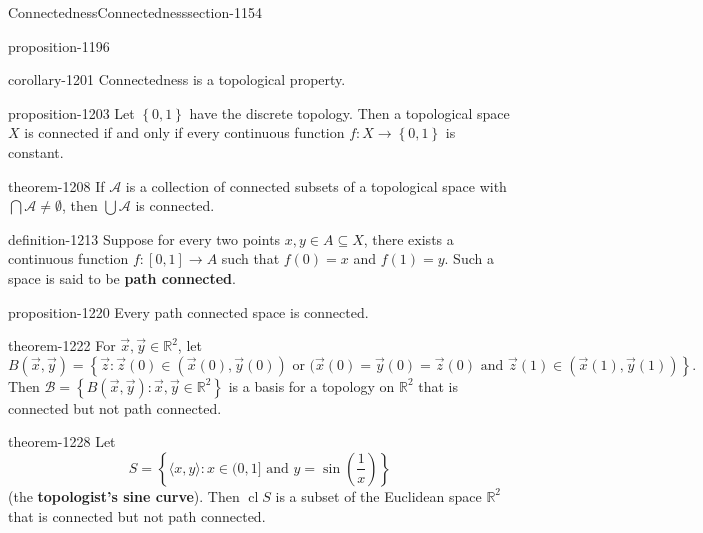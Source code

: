 \documentclass[oneside,10pt,]{article}
\newcommand{\terminology}[1]{\textbf{#1}}
\newcommand{\tuple}[1]{\langle #1 \rangle}
\newcommand{\mb}{\mathbb}
\newcommand{\mc}{\mathcal}
\newcommand{\cl}{\operatorname{cl}}
\newcommand{\setBuilder}[2]{\left\{#1:#2\right\}}
\newcommand{\setList}[1]{\left\{#1\right\}}
\begin{document}
\begin{sectionptx}{Connectedness}{}{Connectedness}{}{}{section-1154}
\begin{proposition}{}{}{proposition-1196}
\end{proposition}
\begin{corollary}{}{}{corollary-1201}%
\hypertarget{p-1202}{}%
Connectedness is a topological property.%
\end{corollary}
\begin{proposition}{}{}{proposition-1203}%
\hypertarget{p-1204}{}%
Let \(\setList{0,1}\) have the discrete topology. Then a topological space \(X\) is connected if and only if every continuous function \(f:X\to\setList{0,1}\) is constant.%
\end{proposition}
\begin{theorem}{}{}{theorem-1208}%
\hypertarget{p-1209}{}%
If \(\mc A\) is a collection of connected subsets of a topological space with \(\bigcap\mc A\not=\emptyset\), then \(\bigcup\mc A\) is connected.%
\end{theorem}
\begin{definition}{}{definition-1213}%
\hypertarget{p-1214}{}%
Suppose for every two points \(x,y\in A\subseteq X\), there exists a continuous function \(f:[0,1]\to A\) such that \(f(0)=x\) and \(f(1)=y\). Such a space is said to be \terminology{path connected}.%
\end{definition}
\begin{proposition}{}{}{proposition-1220}%
\hypertarget{p-1221}{}%
Every path connected space is connected.%
\end{proposition}
\begin{theorem}{}{}{theorem-1222}%
\hypertarget{p-1223}{}%
For \(\vec x,\vec y\in\mb R^2\), let%
\begin{equation*}
B(\vec x,\vec y)=\setBuilder{\vec z}{\vec z(0)\in(\vec x(0),\vec y(0))
\text{ or } (\vec x(0)=\vec y(0)=\vec z(0) \text{ and }
\vec z(1)\in(\vec x(1),\vec y(1))}\text{.}
\end{equation*}
Then \(\mc B=\setBuilder{B(\vec x,\vec y)}{\vec x,\vec y\in\mb R^2}\) is a basis for a topology on \(\mb R^2\) that is connected but not path connected.%
\end{theorem}
\begin{theorem}{}{}{theorem-1228}%
\hypertarget{p-1229}{}%
Let%
\begin{equation*}
S=
\setBuilder{\tuple{x,y}}{x\in(0,1]\text{ and }
y=\sin\left(\frac{1}{x}\right)}
\end{equation*}
(the \terminology{topologist's sine curve}). Then \(\cl S\) is a subset of the Euclidean space \(\mb R^2\) that is connected but not path connected.%
\end{theorem}
\end{sectionptx}
\end{document}
